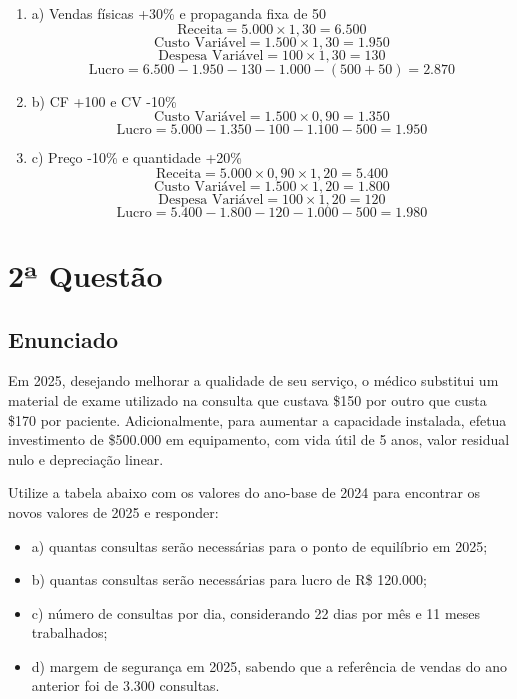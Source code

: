 \documentclass[12pt]{article}
\begin{document}
\begin{enumerate}
\item a) Vendas físicas +30\% e propaganda fixa de 50
\label{sec:orga08b579}
\[
\text{Receita} = 5.000 \times 1{,}30 = 6.500
\]
\[
\text{Custo Variável} = 1.500 \times 1{,}30 = 1.950
\]
\[
\text{Despesa Variável} = 100 \times 1{,}30 = 130
\]
\[
\text{Lucro} = 6.500 - 1.950 - 130 - 1.000 - (500 + 50) = 2.870
\]

\item b) CF +100 e CV -10\%
\label{sec:org16723cb}
\[
\text{Custo Variável} = 1.500 \times 0{,}90 = 1.350
\]
\[
\text{Lucro} = 5.000 - 1.350 - 100 - 1.100 - 500 = 1.950
\]

\item c) Preço -10\% e quantidade +20\%
\label{sec:org4c36e20}
\[
\text{Receita} = 5.000 \times 0{,}90 \times 1{,}20 = 5.400
\]
\[
\text{Custo Variável} = 1.500 \times 1{,}20 = 1.800
\]
\[
\text{Despesa Variável} = 100 \times 1{,}20 = 120
\]
\[
\text{Lucro} = 5.400 - 1.800 - 120 - 1.000 - 500 = 1.980
\]
\end{enumerate}

\section{2ª Questão}
\label{sec:org87a6e8c}

\subsection{Enunciado}
\label{sec:orgbc4c90e}
Em 2025, desejando melhorar a qualidade de seu serviço, o médico substitui um material de exame utilizado na consulta que custava \$150 por outro que custa \$170 por paciente. Adicionalmente, para aumentar a capacidade instalada, efetua investimento de \$500.000 em equipamento, com vida útil de 5 anos, valor residual nulo e depreciação linear.

Utilize a tabela abaixo com os valores do ano-base de 2024 para encontrar os novos valores de 2025 e responder:
\begin{itemize}
\item a) quantas consultas serão necessárias para o ponto de equilíbrio em 2025;
\item b) quantas consultas serão necessárias para lucro de R\$ 120.000;
\item c) número de consultas por dia, considerando 22 dias por mês e 11 meses trabalhados;
\item d) margem de segurança em 2025, sabendo que a referência de vendas do ano anterior foi de 3.300 consultas.
\end{itemize}
\end{document}
